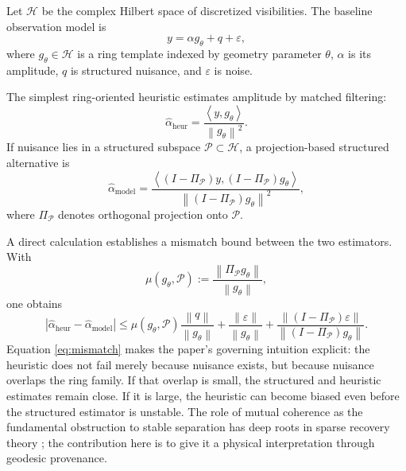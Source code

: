 \documentclass[11pt,a4paper]{article}
\theoremstyle{definition}
\theoremstyle{remark}
\newcommand{\inner}[2]{\left\langle #1, #2 \right\rangle}
\newcommand{\norm}[1]{\left\lVert #1 \right\rVert}
\newcommand{\abs}[1]{\left\lvert #1 \right\rvert}
\begin{document}
Let $\mathcal H$ be the complex Hilbert space of discretized visibilities. The baseline observation model is
\begin{equation}
y = \alpha g_\theta + q + \varepsilon,
\label{eq:baseline-model}
\end{equation}
where $g_\theta \in \mathcal H$ is a ring template indexed by geometry parameter $\theta$, $\alpha$ is its amplitude, $q$ is structured nuisance, and $\varepsilon$ is noise.

The simplest ring-oriented heuristic estimates amplitude by matched filtering:
\begin{equation}
\hat\alpha_{\mathrm{heur}}
=
\frac{\inner{y}{g_\theta}}{\norm{g_\theta}^2}.
\label{eq:heuristic}
\end{equation}
If nuisance lies in a structured subspace $\mathcal P \subset \mathcal H$, a projection-based structured alternative is
\begin{equation}
\hat\alpha_{\mathrm{model}}
=
\frac{\inner{(I-\Pi_{\mathcal P})y}{(I-\Pi_{\mathcal P})g_\theta}}
{\norm{(I-\Pi_{\mathcal P})g_\theta}^2},
\label{eq:model-est}
\end{equation}
where $\Pi_{\mathcal P}$ denotes orthogonal projection onto $\mathcal P$.

A direct calculation establishes a mismatch bound between the two estimators. With
\[
\mu(g_\theta,\mathcal P):=\frac{\norm{\Pi_{\mathcal P}g_\theta}}{\norm{g_\theta}},
\]
one obtains
\begin{equation}
\abs{\hat\alpha_{\mathrm{heur}}-\hat\alpha_{\mathrm{model}}}
\le
\mu(g_\theta,\mathcal P)\frac{\norm{q}}{\norm{g_\theta}}
+
 \frac{\norm{\varepsilon}}{\norm{g_\theta}}
+
 \frac{\norm{(I-\Pi_{\mathcal P})\varepsilon}}{\norm{(I-\Pi_{\mathcal P})g_\theta}}.
\label{eq:mismatch}
\end{equation}
Equation \eqref{eq:mismatch} makes the paper's governing intuition explicit: the heuristic does not fail merely because nuisance exists, but because nuisance overlaps the ring family. If that overlap is small, the structured and heuristic estimates remain close. If it is large, the heuristic can become biased even before the structured estimator is unstable. The role of mutual coherence as the fundamental obstruction to stable separation has deep roots in sparse recovery theory \citep{Candes2006Robust,Donoho2006CS}; the contribution here is to give it a physical interpretation through geodesic provenance.
\end{document}
